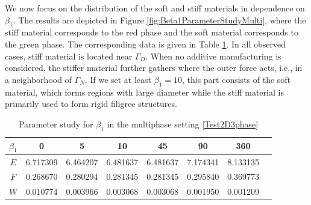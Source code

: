 \documentclass[a4paper,11pt]{article}
\theoremstyle{remark}
\begin{document}
We now focus on the distribution
of the soft and stiff materials
in dependence on $\beta_1$.
The results are depicted in Figure \ref{fig:Beta1ParameterStudyMulti}, where the stiff material corresponds to the red phase and the soft material corresponds to the green phase. The corresponding data is given in Table \ref{tab:Beta1ParameterStudyMultiphase}.
In all observed cases, stiff material is located near $\Gamma_D$. 
When no additive manufacturing is considered, the stiffer material further gathers where the outer force acts, i.e., in a neighborhood of $\Gamma_N$.
%
If we set at least $\beta_1=10$, this part consists of the soft material, which forms regions with large diameter while the stiff material is primarily used
to form rigid filigree structures.
%
\begin{table}[th!]
\centering
\begin{tabular}{|c|c|c|c|c|c|c|c|}
\hline
  \textbf{$\beta_1$} & 0 & 5 & 10 & 45 & 90 &  360 \\
\hline
\hline
\textbf{$E$} & 6.717309 & 6.464207 & 6.481637 & 6.481637 & 7.174341 &  8.133135 \\
\hline
\textbf{$F$} & 0.268670 & 0.280294 & 0.281345 & 0.281345 & 0.295840 &  0.369773 \\
\hline
\textbf{$W$} & 0.010774 & 0.003966 & 0.003068 & 0.003068 & 0.001950 &  0.001209 \\
\hline
\end{tabular}
\caption{Parameter study for $\beta_1$
in the multiphase setting \ref{Test2D3phase}}
\label{tab:Beta1ParameterStudyMultiphase}
\end{table}
\end{document}
